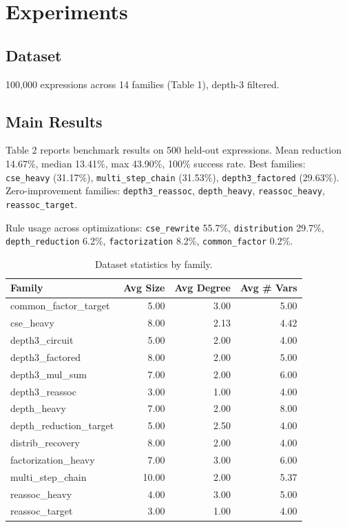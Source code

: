 \documentclass[10pt]{article}
\begin{document}
\section{Experiments}

\subsection{Dataset}

100,000 expressions across 14 families (Table 1), depth-3 filtered.

\subsection{Main Results}

Table 2 reports benchmark results on 500 held-out expressions. Mean reduction
14.67\%, median 13.41\%, max 43.90\%, 100\% success rate. Best families:
\texttt{cse\_heavy} (31.17\%), \texttt{multi\_step\_chain} (31.53\%),
\texttt{depth3\_factored} (29.63\%). Zero-improvement families:
\texttt{depth3\_reassoc}, \texttt{depth\_heavy}, \texttt{reassoc\_heavy},
\texttt{reassoc\_target}.

Rule usage across optimizations: \texttt{cse\_rewrite} 55.7\%, \texttt{distribution}
29.7\%, \texttt{depth\_reduction} 6.2\%, \texttt{factorization} 8.2\%,
\texttt{common\_factor} 0.2\%.

\begin{table}[h]
\centering
\caption{Dataset statistics by family.}
\label{tab:dataset}
\begin{tabular}{lrrr}
\toprule
Family & Avg Size & Avg Degree & Avg \# Vars \\
\midrule
common\_factor\_target & 5.00 & 3.00 & 5.00 \\
cse\_heavy & 8.00 & 2.13 & 4.42 \\
depth3\_circuit & 5.00 & 2.00 & 4.00 \\
depth3\_factored & 8.00 & 2.00 & 5.00 \\
depth3\_mul\_sum & 7.00 & 2.00 & 6.00 \\
depth3\_reassoc & 3.00 & 1.00 & 4.00 \\
depth\_heavy & 7.00 & 2.00 & 8.00 \\
depth\_reduction\_target & 5.00 & 2.50 & 4.00 \\
distrib\_recovery & 8.00 & 2.00 & 4.00 \\
factorization\_heavy & 7.00 & 3.00 & 6.00 \\
multi\_step\_chain & 10.00 & 2.00 & 5.37 \\
reassoc\_heavy & 4.00 & 3.00 & 5.00 \\
reassoc\_target & 3.00 & 1.00 & 4.00 \\
\bottomrule
\end{tabular}
\end{table}
\end{document}
